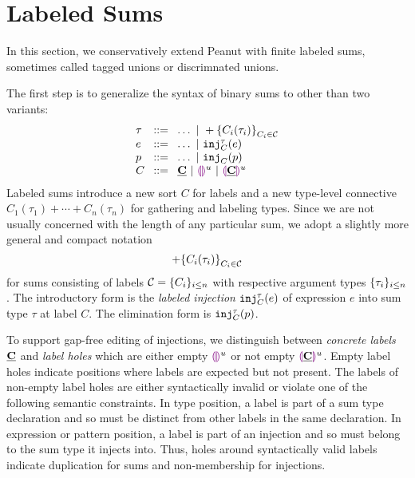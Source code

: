 \section{Labeled Sums}\label{sec:labeledsums}

In this section, we conservatively extend Peanut with finite labeled sums, sometimes called tagged unions or discrimnated unions.

The first step is to generalize the syntax of binary sums to other than two variants:
\[
  \arraycolsep=4pt\begin{array}{lll}
    \tau & ::= & \ldots ~\vert~ \tlabeledsum{C_i(\tau_i)}_{C_i \in \tagset} \\
    e    & ::= & \ldots ~\vert~ \hinj{C}{\tau}{e}                           \\
    p    & ::= & \ldots ~\vert~ \hinjp{C}{p}                                \\
    C    & ::= & \tagC ~\vert~ \tagehole{u} ~\vert~ \taghole{\tagC}{u}
  \end{array}
\]
Labeled sums introduce a new sort $C$ for labels and a new type-level connective $C_1(\tau_1) + \cdots + C_n(\tau_n)$ for gathering and labeling types.
Since we are not usually concerned with the length of any particular sum,
we adopt a slightly more general and compact notation
\[+\mathopen{}\left\{C_i(\tau_i)\right\}_{C_i \in \mathcal{C}}\]
for sums consisting of labels $\mathcal{C} = \{C_i\}_{i \leq n}$ with respective argument types $\{\tau_i\}_{i \leq n}$.
The introductory form is the \emph{labeled injection} $\mathtt{inj}_{C}^{\tau}({e})$ of expression $e$ into sum type $\tau$ at label $C$.
The elimination form is $\mathtt{inj}_{C}^{\tau}({p})$.

To support gap-free editing of injections, we distinguish between \emph{concrete labels} $\underline{\mathbf{C}}$
and \emph{label holes} which are either empty $\textcolor{violet}{\llparenthesis}\textcolor{violet}{\rrparenthesis}^{u}$ or not empty $\textcolor{violet}{\llparenthesis}\underline{\mathbf{C}}\textcolor{violet}{\rrparenthesis}^{u}$.
Empty label holes indicate positions where labels are expected but not present.
The labels of non-empty label holes are either syntactically invalid or violate one of the following semantic constraints.
In type position, a label is part of a sum type declaration and so must be distinct from other labels in the same declaration.
In expression or pattern position, a label is part of an injection and so must belong to the sum type it injects into.
Thus, holes around syntactically valid labels indicate duplication for sums and non-membership for injections.

